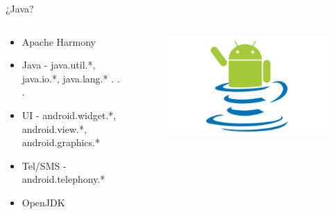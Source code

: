 \documentclass{beamer}
\begin{document}
\begin{frame}{¿Java?}
         \begin{columns}[T] %
        \begin{column}[T]{5cm} %
    \begin{itemize}
    \item Apache Harmony    
    \item Java - java.util.*, java.io.*, java.lang.* . . .
    \item UI - android.widget.*, android.view.*, android.graphics.*
    \item Tel/SMS - android.telephony.*
    \item OpenJDK
\end{itemize}
        \end{column}
        \begin{column}[T]{5cm} %
            \begin{figure}
                \centering
                \includegraphics[width=\linewidth]{Images/dalvik}
            \end{figure}
            
        \end{column}
    \end{columns}
    

\end{frame}
\end{document}
